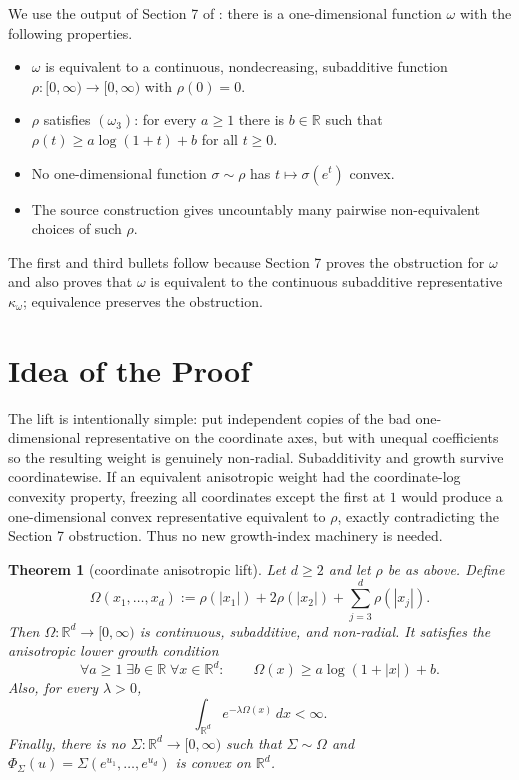 \documentclass[11pt]{article}
\newtheorem{theorem}{Theorem}
\newcommand{\R}{\mathbb{R}}
\newcommand{\dd}{\,d}
\begin{document}
We use the output of Section 7 of \cite{Schindl2510}: there is a
one-dimensional function $\omega$ with the following properties.
\begin{itemize}
\item $\omega$ is equivalent to a continuous, nondecreasing, subadditive
  function $\rho:[0,\infty)\to[0,\infty)$ with $\rho(0)=0$.
\item $\rho$ satisfies $(\omega_3)$: for every $a\ge 1$ there is $b\in\R$ such
  that $\rho(t)\ge a\log(1+t)+b$ for all $t\ge 0$.
\item No one-dimensional function $\sigma\sim\rho$ has $t\mapsto\sigma(e^t)$
  convex.
\item The source construction gives uncountably many pairwise non-equivalent
  choices of such $\rho$.
\end{itemize}
The first and third bullets follow because Section 7 proves the obstruction for
$\omega$ and also proves that $\omega$ is equivalent to the continuous
subadditive representative $\kappa_\omega$; equivalence preserves the
obstruction.

\section*{Idea of the Proof}

The lift is intentionally simple: put independent copies of the bad
one-dimensional representative on the coordinate axes, but with unequal
coefficients so the resulting weight is genuinely non-radial.  Subadditivity
and growth survive coordinatewise.  If an equivalent anisotropic weight had the
coordinate-log convexity property, freezing all coordinates except the first at
$1$ would produce a one-dimensional convex representative equivalent to
$\rho$, exactly contradicting the Section 7 obstruction.  Thus no new
growth-index machinery is needed.

\begin{theorem}[coordinate anisotropic lift]
Let $d\ge 2$ and let $\rho$ be as above.  Define
\[
  \Omega(x_1,\ldots,x_d)
  := \rho(|x_1|)+2\rho(|x_2|)
     +\sum_{j=3}^d \rho(|x_j|).
\]
Then $\Omega:\R^d\to[0,\infty)$ is continuous, subadditive, and non-radial.  It
satisfies the anisotropic lower growth condition
\[
  \forall a\ge 1\;\exists b\in\R\;\forall x\in\R^d:\qquad
  \Omega(x)\ge a\log(1+|x|)+b.
\]
Also, for every $\lambda>0$,
\[
  \int_{\R^d} e^{-\lambda\Omega(x)}\dd x<\infty.
\]
Finally, there is no $\Sigma:\R^d\to[0,\infty)$ such that $\Sigma\sim\Omega$
and $\Phi_\Sigma(u)=\Sigma(e^{u_1},\ldots,e^{u_d})$ is convex on $\R^d$.
\end{theorem}
\end{document}
